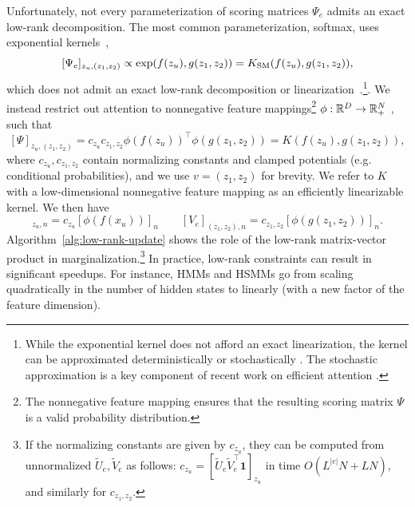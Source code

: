 \documentclass{article}
\begin{document}
Unfortunately, not every parameterization of scoring matrices $\Psi_e$
admits an exact low-rank decomposition.
The most common parameterization, softmax, uses
exponential kernels~\citep{tsai2019kernelattn}, $$[\Psi_e]_{z_u,(z_1,z_2)} \propto 
    \exp(f(z_u), g(z_1,z_2)) = K_{\mathrm{SM}}(f(z_u), g(z_1, z_2)),$$ 
which does not admit an exact low-rank decomposition or linearization~\citep{steinwart2006explicit}.\footnote{
While the exponential kernel does not afford an exact linearization, the kernel can be approximated deterministically \citep{cotter2011approx} or stochastically \citep{rahimi2007rff}.
The stochastic approximation is a key component of recent work on efficient attention \citep{choromanski2020performer,peng2021rfa}.}.
We instead restrict out attention to nonnegative feature mappings\footnote{The nonnegative feature mapping ensures that the resulting scoring matrix $\Psi$ is a valid probability distribution.} $\phi:\mathbb{R}^D\to\mathbb{R}^N_+$ \citep{choromanski2020performer}, such that
\[[\Psi]_{z_u, (z_1, z_2)} = c_{z_u} c_{z_1,z_2} \phi(f(z_u))^\top\phi(g(z_{1}, z_{2})) = K(f(z_u), g(z_1, z_2)),  \]
where $c_{z_u},c_{z_1,z_2}$ contain normalizing constants and clamped potentials (e.g. conditional probabilities), and we use $v = (z_1,z_2)$ for brevity.
We refer to $K$ with a low-dimensional nonnegative feature mapping
as an efficiently linearizable kernel.
We then have
\begin{equation}
    [U_e]_{z_u,n} = c_{z_u}[\phi(f(x_u))]_n 
    \qquad
    [V_e]_{(z_1,z_2),n} = c_{z_1,z_2} [\phi(g(z_1,z_2))]_n.
\end{equation}
Algorithm~\ref{alg:low-rank-update} shows the role of the low-rank
matrix-vector product in marginalization.\footnote{
If the normalizing constants are given by $c_{z_u}$,
they can be computed from unnormalized $\tilde{U}_e,\tilde{V}_e$ as follows: $c_{z_u} = [\tilde{U}_e\tilde{V}_e^\top\mathbf{1}]_{z_u}$ in time $O(L^{|e|}N + LN)$, and similarly for $c_{z_1,z_2}$.
}
In practice, low-rank constraints can result in significant speedups. For instance, HMMs and HSMMs go from scaling quadratically
in the number of hidden states to linearly (with a new factor of the
feature dimension).
\end{document}
